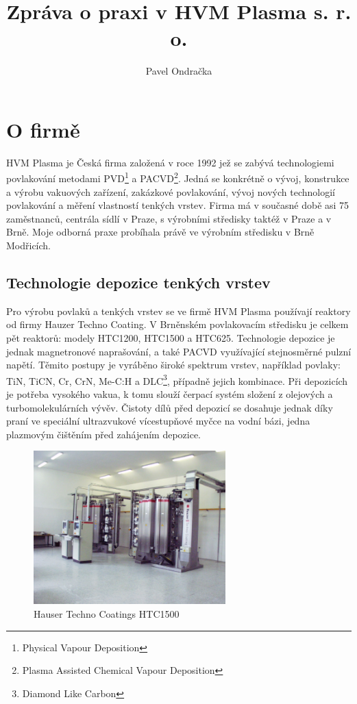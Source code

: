 \documentclass[12pt]{article}
\begin{document}
\title{Zpráva o praxi v HVM Plasma s. r. o.}
\author{Pavel Ondračka}
\maketitle

\section{O firmě}
HVM Plasma je Česká firma založená v roce 1992 jež se zabývá technologiemi pov\-la\-ko\-vá\-ní metodami PVD\footnote{Physical Vapour Deposition} a PACVD\footnote{Plasma Assisted Chemical Vapour Deposition}. Jedná se konkrétně o vývoj, konstrukce a výrobu vakuových zařízení, zakázkové povlakování, vývoj nových technologií povlakování a měření vlastností tenkých vrstev. Firma má v současné době asi 75 zaměstnanců, centrála sídlí v Praze, s výrobními středisky taktéž v Praze a v Brně. Moje odborná praxe probíhala právě ve výrobním středisku v Brně Modřicích.

\subsection{Technologie depozice tenkých vrstev}
Pro výrobu povlaků a tenkých vrstev se ve firmě HVM Plasma používají reaktory od firmy Hauzer Techno Coating. V Brněnském povlakovacím středisku je celkem pět reaktorů: modely HTC1200, HTC1500 a HTC625. Technologie depozice je jednak magnetronové naprašování, a také PACVD  využívající stejnosměrné pulzní napětí. Těmito postupy je vyráběno široké spektrum vrstev, například povlaky: TiN, TiCN, Cr, CrN, Me-C:H a DLC\footnote{Diamond Like Carbon}, případně jejich kombinace. Při depozicích je potřeba vysokého vakua, k tomu slouží čerpací systém složení z olejových a turbomolekulárních vývěv. Čistoty dílů před depozicí se dosahuje jednak díky praní ve speciální ultrazvukové vícestupňové myčce na vodní bázi, jedna plazmovým čištěním před zahájením depozice.  

\begin{figure}[htbp]
\centering
\includegraphics[width=280px]{htc1500.jpg}
\caption{Hauser Techno Coatings HTC1500}
\label{htc1500}
\end{figure}
\end{document}
